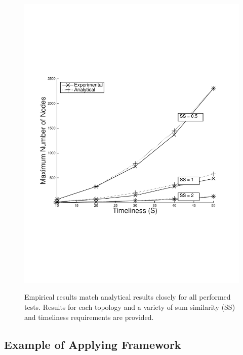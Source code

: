 \begin{figure}[]
{        \includegraphics[scale=0.29, clip=true, trim=15mm 65mm 20mm 65mm]{figures/scal_sim_results/grid_uni_2d_mhop_2.pdf}
        \label{fig:scal_vs_qoi_grid}
        }

   \caption{Empirical results match analytical results closely for all performed tests.  Results for each topology and a variety of sum similarity (SS) and timeliness requirements are provided.}
   \label{fig:scal_vs_qoi}

\vspace{-6mm}
\end{figure}

\subsection{Example of Applying Framework}
\label{sec:example_apply_fw}

